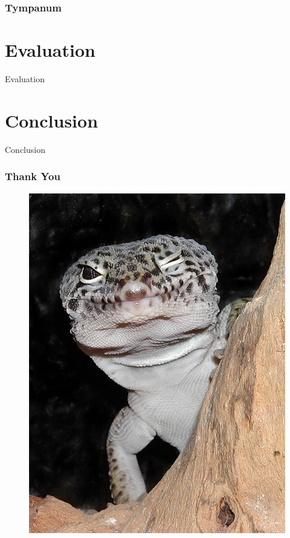 \documentclass{beamer}
\begin{document}
\begin{frame}
\frametitle{Tympanum}
\begin{figure}[htb!]

\end{figure}

\end{frame}

\section{Evaluation}
\begin{frame}
 Evaluation
\end{frame}

\section{Conclusion}
\begin{frame}
 Conclusion
\end{frame}

\begin{frame}
 \frametitle{Thank You}
 \begin{figure}
  \centering
  \includegraphics[width=.3\textwidth]{Diagrams/geckowink.jpg}
 \end{figure}

\end{frame}
\end{document}
